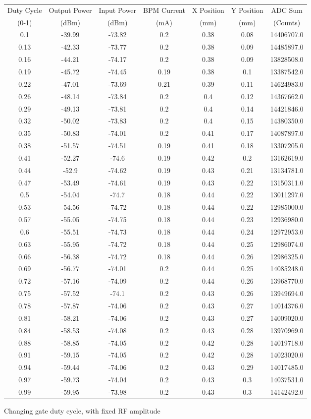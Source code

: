 \documentclass[a4paper, 11pt]{article}%
\begin{document}
%
\begin{figure}[htbp]%
\centering%
\caption{Changing gate duty cycle, with fixed RF amplitude }%
\begin{tabular}{|c|c|c|c|c|c|c|}%
\hline%
Duty Cycle&Output Power&Input Power&BPM Current&X Position&Y Position&ADC Sum\\%
(0{-}1)&(dBm)&(dBm)&(mA)&(mm)&(mm)&(Counts)\\%
\hline%
0.1&{-}39.99&{-}73.82&0.2&0.38&0.08&14406707.0\\%
0.13&{-}42.33&{-}73.77&0.2&0.38&0.09&14485897.0\\%
0.16&{-}44.21&{-}74.17&0.2&0.38&0.09&13828508.0\\%
0.19&{-}45.72&{-}74.45&0.19&0.38&0.1&13387542.0\\%
0.22&{-}47.01&{-}73.69&0.21&0.39&0.11&14624983.0\\%
0.26&{-}48.14&{-}73.84&0.2&0.4&0.12&14367662.0\\%
0.29&{-}49.13&{-}73.81&0.2&0.4&0.14&14421846.0\\%
0.32&{-}50.02&{-}73.83&0.2&0.4&0.15&14380350.0\\%
0.35&{-}50.83&{-}74.01&0.2&0.41&0.17&14087897.0\\%
0.38&{-}51.57&{-}74.51&0.19&0.41&0.18&13307205.0\\%
0.41&{-}52.27&{-}74.6&0.19&0.42&0.2&13162619.0\\%
0.44&{-}52.9&{-}74.62&0.19&0.43&0.21&13134781.0\\%
0.47&{-}53.49&{-}74.61&0.19&0.43&0.22&13150311.0\\%
0.5&{-}54.04&{-}74.7&0.18&0.44&0.22&13011297.0\\%
0.53&{-}54.56&{-}74.72&0.18&0.44&0.22&12985000.0\\%
0.57&{-}55.05&{-}74.75&0.18&0.44&0.23&12936980.0\\%
0.6&{-}55.51&{-}74.73&0.18&0.44&0.24&12972953.0\\%
0.63&{-}55.95&{-}74.72&0.18&0.44&0.25&12986074.0\\%
0.66&{-}56.38&{-}74.72&0.18&0.44&0.26&12986325.0\\%
0.69&{-}56.77&{-}74.01&0.2&0.44&0.25&14085248.0\\%
0.72&{-}57.16&{-}74.09&0.2&0.44&0.26&13968770.0\\%
0.75&{-}57.52&{-}74.1&0.2&0.43&0.26&13949694.0\\%
0.78&{-}57.87&{-}74.06&0.2&0.43&0.27&14014376.0\\%
0.81&{-}58.21&{-}74.06&0.2&0.43&0.27&14009020.0\\%
0.84&{-}58.53&{-}74.08&0.2&0.43&0.28&13970969.0\\%
0.88&{-}58.85&{-}74.05&0.2&0.42&0.28&14019718.0\\%
0.91&{-}59.15&{-}74.05&0.2&0.42&0.28&14023020.0\\%
0.94&{-}59.44&{-}74.06&0.2&0.43&0.29&14017485.0\\%
0.97&{-}59.73&{-}74.04&0.2&0.43&0.3&14037531.0\\%
0.99&{-}59.95&{-}73.98&0.2&0.43&0.3&14142492.0\\%
\hline%
\end{tabular}%
\end{figure}%
\end{document}
